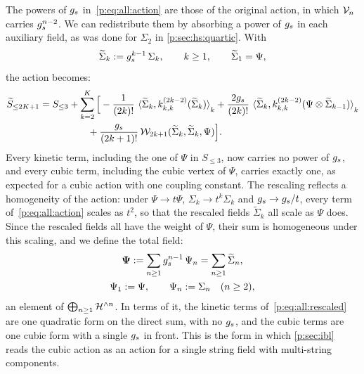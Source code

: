 The powers of $g_s$ in~\eqref{p:eq:all:action} are those of the original action, in which $\mathcal{V}_{n}$ carries $g_s^{n - 2}$.
We can redistribute them by absorbing a power of $g_s$ in each auxiliary field, as was done for $\Sigma_2$ in \cref{p:sec:hs:quartic}.
With
\begin{equation}
  \label{p:eq:all:rescaling}
  \widetilde{\Sigma}_k
    := g_s^{k - 1} \, \Sigma_k,
  \qquad
  k \ge 1,
  \qquad
  \widetilde{\Sigma}_1
    = \Psi,
\end{equation}
the action becomes:
\begin{equation}
  \label{p:eq:all:rescaled}
  \begin{aligned}
    \caction[\le 2 K + 1]
      &
      = S_{\le 3}
        + \sum_{k = 2}^{K} \Big[
          - \frac{1}{(2 k)!} \, \pair[k]{\widetilde{\Sigma}_k}{\kin{k}{}{2 k - 2}(\widetilde{\Sigma}_k)}
          + \frac{2 \gs}{(2 k)!} \, \pair[k]{\widetilde{\Sigma}_k}{\kin{k}{}{2 k - 2}(\Psi \otimes \widetilde{\Sigma}_{k - 1})}
      \\ &
      \qquad\qquad\quad
          + \frac{\gs}{(2 k + 1)!} \, \dvertex{2 k + 1}(\widetilde{\Sigma}_k, \widetilde{\Sigma}_k, \Psi)
        \Big].
  \end{aligned}
\end{equation}
Every kinetic term, including the one of $\Psi$ in $S_{\le 3}$, now carries no power of $g_s$, and every cubic term, including the cubic vertex of $\Psi$, carries exactly one, as expected for a cubic action with one coupling constant.
The rescaling reflects a homogeneity of the action: under $\Psi \to t \Psi$, $\Sigma_k \to t^k \Sigma_k$ and $g_s \to g_s / t$, every term of~\eqref{p:eq:all:action} scales as $t^2$, so that the rescaled fields $\widetilde{\Sigma}_k$ all scale as $\Psi$ does.
Since the rescaled fields all have the weight of $\Psi$, their sum is homogeneous under this scaling, and we define the total field:
\begin{equation}
  \label{p:eq:all:total-field}
  \begin{gathered}
    \boldsymbol{\Psi}
      := \sum_{n \ge 1} g_s^{n - 1} \, \Psi_n
      = \sum_{n \ge 1} \widetilde{\Sigma}_n,
    \\
    \Psi_1
      := \Psi,
    \qquad
    \Psi_n
      := \Sigma_n
    \quad
    (n \ge 2),
  \end{gathered}
\end{equation}
an element of $\bigoplus_{n \ge 1} \mathcal{H}^{\wedge n}$.
In terms of it, the kinetic terms of~\eqref{p:eq:all:rescaled} are one quadratic form on the direct sum, with no $g_s$, and the cubic terms are one cubic form with a single $g_s$ in front.
This is the form in which \cref{p:sec:ibl} reads the cubic action as an action for a single string field with multi-string components.

